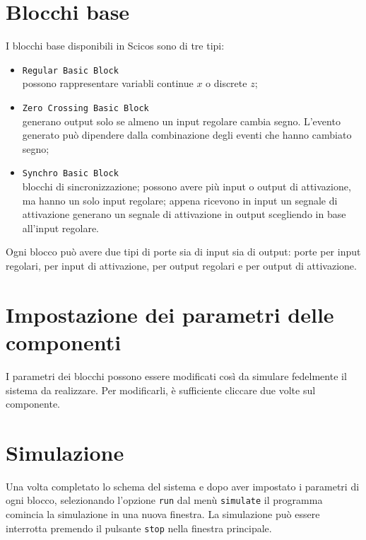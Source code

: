 \section{Blocchi base}
I blocchi base disponibili in Scicos sono di tre tipi:
\begin{itemize}
\item \verb+Regular Basic Block+ \\
possono rappresentare variabli continue $x$ o discrete $z$;
\item \verb+Zero Crossing Basic Block+ \\
generano output solo se almeno un input regolare cambia segno.
L'evento generato pu\`o dipendere dalla combinazione degli eventi che hanno cambiato segno;
\item \verb+Synchro Basic Block+ \\
blocchi di sincronizzazione; possono avere pi\`u input o output di attivazione, ma hanno un solo input regolare; appena ricevono in input un segnale di attivazione generano un segnale di attivazione in output scegliendo in base all'input regolare.
\end{itemize}
Ogni blocco pu\`o avere due tipi di porte sia di input sia di output:
porte per input regolari, per input di attivazione, per output regolari e per output di attivazione.

\section{Impostazione dei parametri delle componenti}
I parametri dei blocchi possono essere modificati cos\`i da simulare fedelmente il sistema da realizzare. Per modificarli, \`e sufficiente cliccare due volte sul componente.

\section{Simulazione}
Una volta completato lo schema del sistema e dopo aver impostato i parametri di ogni blocco, selezionando l'opzione \verb+run+ dal men\`u \verb+simulate+ il programma comincia la simulazione in una nuova finestra.
La simulazione pu\`o essere interrotta premendo il pulsante \verb+stop+ nella finestra principale.


